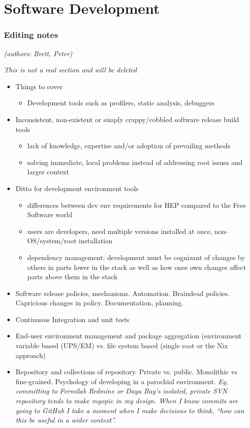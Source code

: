 \section{Software Development}

\subsubsection{Editing notes}

\textit{(authors: Brett, Peter)}

\textit{This is not a real section and will be deleted}

\begin{itemize}
\item Things to cover
  \begin{itemize}
  \item Development tools such as profilers, static analysis, debuggers
  \end{itemize}
\item Inconsistent, non-existent or simply crappy/cobbled software release build tools
  \begin{itemize}
  \item lack of knowledge, expertise and/or adoption of prevailing methods
  \item solving immediate, local problems instead of addressing root issues and larger context
  \end{itemize}
\item Ditto for development environment tools
  \begin{itemize}
  \item differences between dev env requirements for HEP compared to the Free Software world
  \item users are developers, need multiple versions installed at once, non-OS/system/root installation
  \item dependency management: development must be cognizant of changes by others in parts lower in the stack as well as how ones own changes affect parts above them in the stack
  \end{itemize}
\item Software release policies, mechanisms.  Automation.  Braindead policies.  Capricious changes in policy.  Documentation, planning.
\item Continuous Integration and unit tests
\item End-user environment management and package aggregation (environment variable based (UPS/EM) vs. file system based (single root or the Nix approach)
\item Repository and collections of repository.  Private vs. public.  Monolithic vs fine-grained.  Psychology of developing in a parochial environment.  \textit{Eg, committing to Fermilab Redmine or Daya Bay's  isolated, private SVN repository tends to make myopic in my design.  When I know commits are going to GitHub I take a moment when I make decisions to think, ``how can this be useful in a wider context''.}
\end{itemize}

